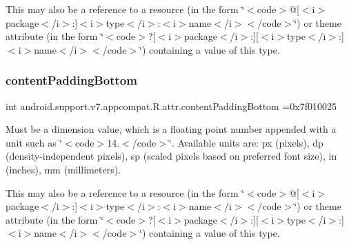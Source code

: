 This may also be a reference to a resource (in the form \char`\"{}$<$code$>$@\mbox{[}$<$i$>$package$<$/i$>$\+:\mbox{]}$<$i$>$type$<$/i$>$\+:$<$i$>$name$<$/i$>$$<$/code$>$\char`\"{}) or theme attribute (in the form \char`\"{}$<$code$>$?\mbox{[}$<$i$>$package$<$/i$>$\+:\mbox{]}\mbox{[}$<$i$>$type$<$/i$>$\+:\mbox{]}$<$i$>$name$<$/i$>$$<$/code$>$\char`\"{}) containing a value of this type. \mbox{\label{classandroid_1_1support_1_1v7_1_1appcompat_1_1R_1_1attr_a6c80b197ceddf31edc9ed8d675a89ea4}} 
\subsubsection{\texorpdfstring{content\+Padding\+Bottom}{contentPaddingBottom}}
{\footnotesize\ttfamily int android.\+support.\+v7.\+appcompat.\+R.\+attr.\+content\+Padding\+Bottom =0x7f010025\hspace{0.3cm}{\ttfamily [static]}}

Must be a dimension value, which is a floating point number appended with a unit such as \char`\"{}$<$code$>$14.\+5sp$<$/code$>$\char`\"{}. Available units are\+: px (pixels), dp (density-\/independent pixels), sp (scaled pixels based on preferred font size), in (inches), mm (millimeters). 

This may also be a reference to a resource (in the form \char`\"{}$<$code$>$@\mbox{[}$<$i$>$package$<$/i$>$\+:\mbox{]}$<$i$>$type$<$/i$>$\+:$<$i$>$name$<$/i$>$$<$/code$>$\char`\"{}) or theme attribute (in the form \char`\"{}$<$code$>$?\mbox{[}$<$i$>$package$<$/i$>$\+:\mbox{]}\mbox{[}$<$i$>$type$<$/i$>$\+:\mbox{]}$<$i$>$name$<$/i$>$$<$/code$>$\char`\"{}) containing a value of this type. \mbox{\label{classandroid_1_1support_1_1v7_1_1appcompat_1_1R_1_1attr_a25b1ff2e90eb5c1effb27911fb561ae7}} 
